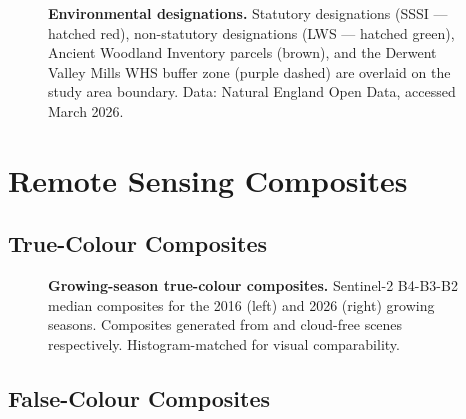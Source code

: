 \begin{figure}[H]
\centering
{}
\caption[Environmental designations within and proximate to the study area.]{%
\textbf{Environmental designations.} Statutory designations (SSSI — hatched red), non-statutory designations (LWS — hatched green), Ancient Woodland Inventory parcels (brown), and the Derwent Valley Mills WHS buffer zone (purple dashed) are overlaid on the study area boundary. Data: Natural England Open Data, accessed March 2026.%
}
\label{fig:cat-designations}
\end{figure}


\section{Remote Sensing Composites}

\subsection{True-Colour Composites}

\begin{figure}[H]
\centering
{}
\caption[Side-by-side true-colour composites 2016 vs 2026.]{%
\textbf{Growing-season true-colour composites.} Sentinel-2 B4-B3-B2 median composites for the 2016 (left) and 2026 (right) growing seasons. Composites generated from  and  cloud-free scenes respectively. Histogram-matched for visual comparability.%
}
\label{fig:cat-rgb-comparison}
\end{figure}

\subsection{False-Colour Composites}

